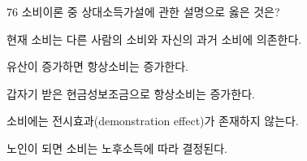 \begin{question}{76}
소비이론 중 상대소득가설에 관한 설명으로 옳은 것은?
\begin{choices}
  \item 현재 소비는 다른 사람의 소비와 자신의 과거 소비에 의존한다.
  \item 유산이 증가하면 항상소비는 증가한다.
  \item 갑자기 받은 현금성보조금으로 항상소비는 증가한다.
  \item 소비에는 전시효과(demonstration effect)가 존재하지 않는다.
  \item 노인이 되면 소비는 노후소득에 따라 결정된다.
\end{choices}
\end{question}
